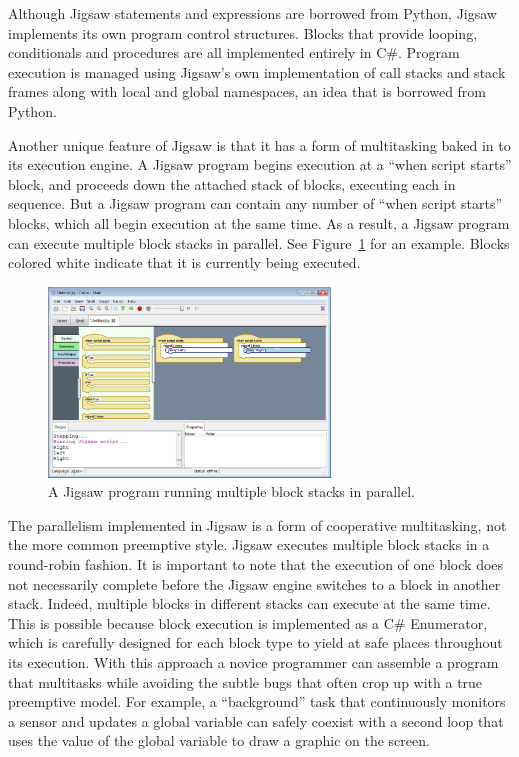 \documentclass[preprint]{sigplanconf}
\begin{document}
Although Jigsaw statements and expressions are borrowed from
Python, Jigsaw implements its own program control
structures. Blocks that provide looping, conditionals and procedures
are all implemented entirely in C\#. Program execution is managed
using Jigsaw's own implementation of call stacks and stack frames
along with local and global namespaces, an idea that is borrowed from
Python.

Another unique feature of Jigsaw is that it has a form of multitasking
baked in to its execution engine. A Jigsaw program begins execution at
a ``when script starts'' block, and proceeds down the attached stack
of blocks, executing each in sequence. But a Jigsaw program can
contain any number of ``when script starts'' blocks, which all begin
execution at the same time. As a result, a Jigsaw program can execute
multiple block stacks in parallel. See Figure~\ref{jigsaw3} for an
example. Blocks colored white indicate that it is currently being
executed.

\begin{figure}[h!]
  \centering
    \includegraphics[width=75mm]{jigsaw3.eps} 
  \caption{A Jigsaw program running multiple block stacks in parallel.}
  \label{jigsaw3}
\end{figure}

The parallelism implemented in Jigsaw is a form of
cooperative multitasking, not the more common preemptive style. Jigsaw
executes multiple block stacks in a round-robin fashion. It is
important to note that the execution of one block does not necessarily
complete before the Jigsaw engine switches to a block in another
stack. Indeed, multiple blocks in different stacks can execute at the
same time. This is possible because block execution is implemented 
as a C\# Enumerator, which is carefully designed for each block type
to yield at safe places throughout its execution. With this
approach a novice programmer can assemble a program that
multitasks while avoiding the subtle bugs that often crop 
up with a true preemptive model. For example, a ``background'' task
that continuously monitors a sensor and updates a global variable 
can safely coexist with a second loop that uses the value of the global
variable to draw a graphic on the screen.
\end{document}
